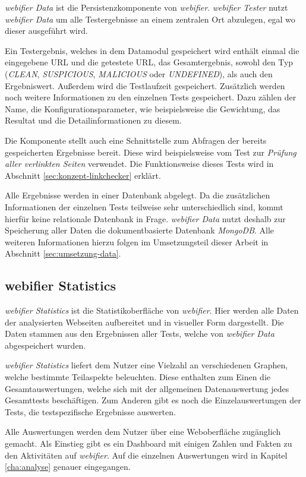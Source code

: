 \textit{webifier Data} ist die Persistenzkomponente von \textit{webifier}. \textit{webifier Tester}
nutzt \textit{webifier Data} um alle Testergebnisse an einem zentralen Ort abzulegen, egal wo dieser
ausgeführt wird.

Ein Testergebnis, welches in dem Datamodul gespeichert wird enthält einmal die eingegebene \acs{URL}
und die getestete \acs{URL}, das Gesamtergebnis, sowohl den Typ (\textit{CLEAN},
\textit{SUSPICIOUS}, \textit{MALICIOUS} oder \textit{UNDEFINED}), als auch den Ergebniswert. Außerdem wird die Testlaufzeit gespeichert. Zusätzlich werden noch weitere Informationen zu den einzelnen Tests gespeichert. Dazu zählen der Name, die Konfigurationsparameter, wie beispielsweise die Gewichtung, das Resultat und die Detailinformationen zu diesem.

Die Komponente stellt auch eine Schnittstelle zum Abfragen der bereits gespeicherten Ergebnisse
bereit. Diese wird beispielsweise vom Test zur \textit{Prüfung aller verlinkten Seiten} verwendet.
Die Funktionsweise dieses Tests wird in Abschnitt \ref{sec:konzept-linkchecker} erklärt.

Alle Ergebnisse werden in einer Datenbank abgelegt. Da die zusätzlichen Informationen der einzelnen
Tests teilweise sehr unterschiedlich sind, kommt hierfür keine relationale Datenbank in Frage.
\textit{webifier Data} nutzt deshalb zur Speicherung aller Daten die dokumentbasierte Datenbank
\textit{MongoDB}. Alle weiteren Informationen hierzu folgen im Umsetzungsteil dieser Arbeit in
Abschnitt \ref{sec:umsetzung-data}.

\subsection{webifier Statistics}
\textit{webifier Statistics} ist die Statistikoberfläche von \textit{webifier}. Hier werden alle
Daten der analysierten Webseiten aufbereitet und in visueller Form dargestellt. Die Daten stammen
aus den Ergebnissen aller Tests, welche von \textit{webifier Data} abgespeichert wurden.

\textit{webifier Statistics} liefert dem Nutzer eine Vielzahl an verschiedenen Graphen, welche
bestimmte Teilaspekte beleuchten. Diese enthalten zum Einen die Gesamtauswertungen, welche sich mit der allgemeinen Datenauswertung jedes Gesamttests beschäftigen. Zum Anderen gibt es noch die Einzelauswertungen der Tests, die testspezifische Ergebnisse auswerten.

Alle Auswertungen werden dem Nutzer über eine Weboberfläche zugänglich gemacht. Als Einstieg gibt es
ein Dashboard mit einigen Zahlen und Fakten zu den Aktivitäten auf \textit{webifier}. Auf
die einzelnen Auswertungen wird in Kapitel \ref{cha:analyse} genauer eingegangen.

